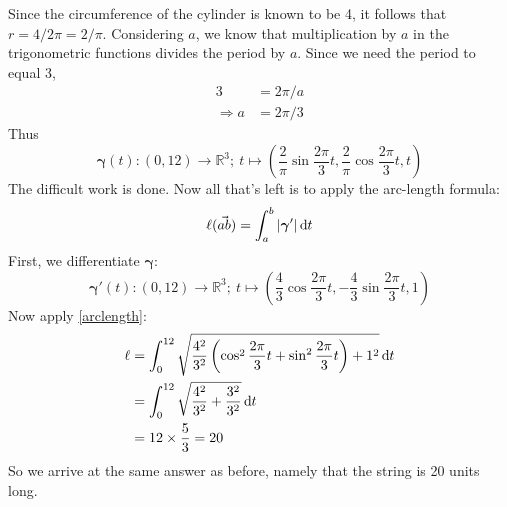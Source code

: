 \documentclass[twocolumn]{article}
\begin{document}
Since the circumference of the cylinder is known to be 4, it follows that $r=4/2\pi=2/\pi$. Considering $a$, we know that multiplication by $a$ in the trigonometric functions divides the period by $a$. Since we need the period to equal 3,
\begin{align*}
3&=2\pi/a\\
\Rightarrow a&=2\pi/3
\end{align*}
Thus
$$\bm{\gamma}(t): (0,12) \rightarrow \mathbb{R}^3;\ t \mapsto (\frac{2}{\pi}\sin{\frac{2\pi}{3}t}, \frac{2}{\pi}\cos{\frac{2\pi}{3}t}, t)$$
The difficult work is done. Now all that's left is to apply the arc-length formula:
\begin{equation}
\ell(\vec{ab})=\int_a^b |\mbox{\protect\boldmath $ \gamma $}'|\, {\rm d} \kern-.015em t
\label{arclength}
\end{equation}
First, we differentiate $\bm{\gamma}$:
$$\bm{\gamma}'(t): (0,12) \rightarrow \mathbb{R}^3;\ t \mapsto (\frac{4}{3}\cos{\frac{2\pi}{3}t}, -\frac{4}{3}\sin{\frac{2\pi}{3}t}, 1)$$
Now apply \cref{arclength}:
\begin{align*}
\ell&=\int_0^{12} \sqrt{\frac{4^2}{3^2} \left(\cos^2{\frac{2\pi}{3}t}+\sin^2{\frac{2\pi}{3}t} \right)+1^2} \, {\rm d} \kern-.015em t \\
&=\int_0^{12} \sqrt{\frac{4^2}{3^2}+\frac{3^2}{3^2}} \, {\rm d} \kern-.015em t \\
&=12\times \frac{5}{3} = 20
\end{align*}
So we arrive at the same answer as before, namely that the string is 20 units long.
\end{document}
